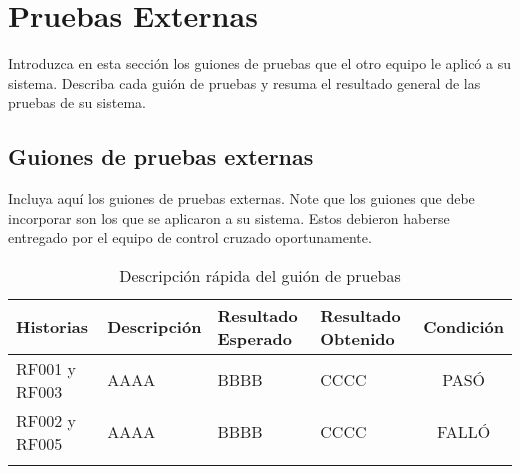 \section{Pruebas Externas}
Introduzca en esta sección los guiones de pruebas que el otro equipo le aplicó a su sistema. Describa cada guión de pruebas y resuma el resultado general de las pruebas de su sistema. 

\subsection{Guiones de pruebas externas}
Incluya aquí los guiones de pruebas externas. Note que los guiones que debe incorporar son los que se aplicaron a su sistema. Estos debieron haberse entregado por el equipo de control cruzado oportunamente.

\begin{longtable}{ | p{2cm} | p{3cm} | p{4cm} | p{4cm} | c |}
      \hline
      \textbf{Historias} & \textbf{Descripción} & \textbf{Resultado Esperado} & \textbf{Resultado Obtenido} & \textbf{Condición}\\
      \hline
      RF001 y RF003 & AAAA & BBBB & CCCC & \color{ForestGreen}PASÓ\\
      \hline
      RF002 y RF005 & AAAA & BBBB & CCCC & \color{Mahogany}FALLÓ\\
      \hline
      
      \caption{Descripción rápida del guión de pruebas}
      \label{TestScript1}
\end{longtable}